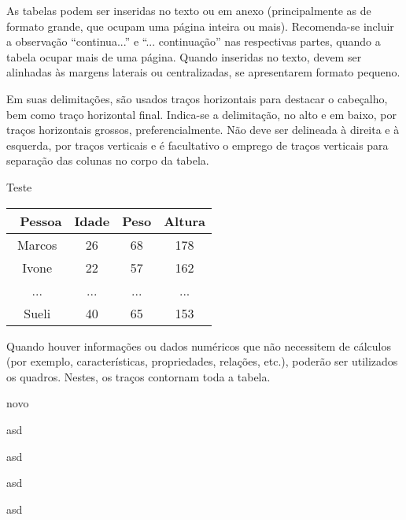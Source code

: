 \documentclass[12pt,oneside,a4paper,chapter=TITLE,section=TITLE,sumario
=tradicional]{abntex2}
\begin{document}
As tabelas podem ser inseridas no texto ou em anexo (principalmente as de 
formato grande, que ocupam uma página inteira ou mais). Recomenda-se incluir a 
observação ``continua...'' e ``... continuação'' nas respectivas partes, quando 
a tabela ocupar mais de uma página. Quando inseridas no texto, devem ser 
alinhadas às margens laterais ou centralizadas, se apresentarem formato pequeno.

Em suas delimitações, são usados traços horizontais para destacar o cabeçalho, 
bem como traço horizontal final. Indica-se a delimitação, no alto e em baixo, 
por traços horizontais grossos, preferencialmente. Não deve ser delineada à 
direita e à esquerda, por traços verticais e é facultativo o emprego de traços 
verticais para separação das colunas no corpo da tabela.

Teste %

\cite{abntex2cite}




\begin{table}[htb]
    \begin{tabular}{c|ccc}
        \hline\
        \textbf{Pessoa} & \textbf{Idade} & \textbf{Peso} & \textbf{Altura} \\ 
        \hline\hline
        Marcos & 26    & 68   & 178    \\ 
        Ivone  & 22    & 57   & 162    \\ 
        ...    & ...   & ...  & ...    \\ 
        Sueli  & 40    & 65   & 153    \\ \hline
    \end{tabular}
    
    \fonteautor
\end{table}
 
Quando houver informações ou dados numéricos que não necessitem de cálculos 
(por exemplo, características, propriedades, relações, etc.), poderão ser 
utilizados os quadros. Nestes, os traços contornam toda a tabela.

\begin{lista}
	\item novo
	\item asd
	\item asd
	\item asd
	\item asd
\end{lista}
\end{document}
